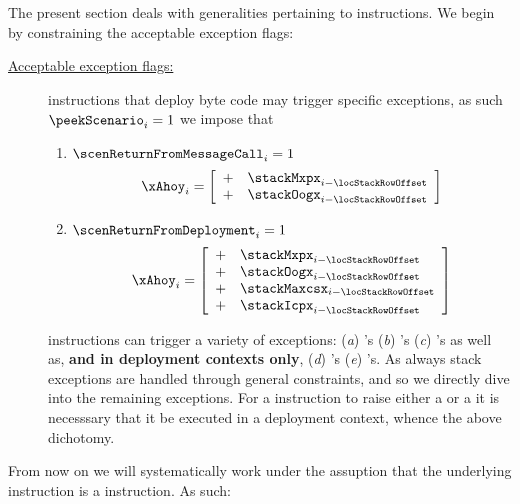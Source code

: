 The present section deals with generalities pertaining to  instructions.
We begin by constraining the acceptable exception flags:
\begin{description}
	\item[\underline{Acceptable exception flags:}]
		 instructions that deploy byte code may trigger specific exceptions, as such
		\If $\peekScenario_{i} = 1$ \Then we impose that
		\begin{enumerate}
			\item \If $\scenReturnFromMessageCall _{i} = 1$ \Then
				\[
					\xAhoy_{i}
					= 
					\left[ \begin{array}{cl}
						+ & \stackMxpx _{i - \locStackRowOffset} \\
						+ & \stackOogx _{i - \locStackRowOffset} \\
					\end{array} \right]
				\]
			\item \If $\scenReturnFromDeployment _{i} = 1$ \Then
				\[
					\xAhoy_{i}
					= 
					\left[ \begin{array}{cl}
						+ & \stackMxpx   _{i - \locStackRowOffset} \\
						+ & \stackOogx   _{i - \locStackRowOffset} \\
						+ & \stackMaxcsx _{i - \locStackRowOffset} \\
						+ & \stackIcpx   _{i - \locStackRowOffset} \\
					\end{array} \right]
				\]
		\end{enumerate}
		\saNote{}  instructions can trigger a variety of exceptions:
		(\emph{a}) \suxSH{}'s
		(\emph{b}) \mxpxSH{}'s
		(\emph{c}) \oogxSH{}'s
		as well as, \textbf{and in deployment contexts only},
		(\emph{d}) \maxcsxSH{}'s
		(\emph{e}) \icpxSH{}'s.
		As always stack exceptions are handled through general constraints, and so we directly dive into the remaining exceptions.
		For a  instruction to raise either a \maxcsxSH{} or a \icpxSH{} it is necesssary that it be executed in a deployment context, whence the above dichotomy.
\end{description}
From now on we will systematically work under the assuption that the underlying instruction is a  instruction.
As such:
\begin{center}
\end{center}

